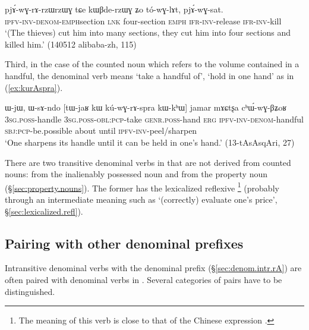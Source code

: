 \begin{exe}
\ex \label{ex:pjArwGrzWrzWG}
 \gll  pjɤ́-wɣ-rɤ-rzɯ\redp{}rzɯɣ tɕe kɯβde-rzɯɣ ʑo tó-wɣ-lɤt, pjɤ́-wɣ-sat. \\
 \textsc{ipfv}-\textsc{inv}-\textsc{denom}-\textsc{emph}\redp{}section \textsc{lnk} four-section \textsc{emph} \textsc{ifr}-\textsc{inv}-release \textsc{ifr}-\textsc{inv}-kill \\
 \glt `(The thieves) cut him into many sections, they cut him into four sections and killed him.'  (140512 alibaba-zh, 115)
\end{exe}

Third, in the case of the counted noun  which refers to the volume contained in a handful, the denominal verb means `take a handful of', `hold in one hand' as in (\ref{ex:kurAspra}).

\begin{exe}
\ex \label{ex:kurAspra}
 \gll ɯ-jɯ, ɯ-sɤ-ndo [tɯ-jaʁ kɯ kú-wɣ-rɤ-spra kɯ-kʰɯ] jamar mɤɕtʂa cʰɯ́-wɣ-βʑoʁ \\
 \textsc{3sg}.\textsc{poss}-handle \textsc{3sg}.\textsc{poss}-\textsc{obl}:\textsc{pcp}-take \textsc{genr}.\textsc{poss}-hand \textsc{erg} \textsc{ipfv}-\textsc{inv}-\textsc{denom}-handful \textsc{sbj}:\textsc{pcp}-be.possible about until \textsc{ipfv}-\textsc{inv}-peel/sharpen \\
\glt `One sharpens its handle until it can be held in one's hand.' (13-tAsAsqAri, 27)
\end{exe}


There are two transitive denominal verbs in  that are not derived from counted nouns:  from the inalienably possessed noun  and  from the property noun  (§\ref{sec:property.nouns}).  The former has the lexicalized reflexive \footnote{The meaning of this verb is close to that of the Chinese expression .} (probably through an intermediate meaning such as `(correctly) evaluate one's price', §\ref{sec:lexicalized.refl}).


\subsection{Pairing with other denominal prefixes}  \label{sec:denom.rA.pairing}
Intransitive denominal verbs with the  denominal prefix (§\ref{sec:denom.intr.rA}) are often paired with denominal verbs in .  Several categories of  pairs have to be distinguished.

